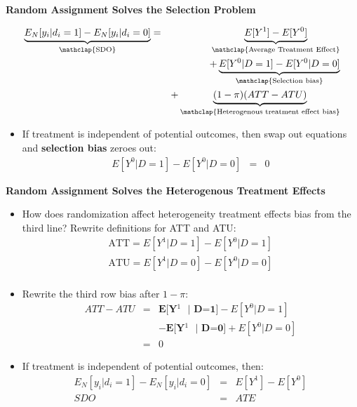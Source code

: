 \documentclass[notes=show]{beamer}
\begin{document}
\begin{frame}[plain]
	\begin{center}
	\textbf{Random Assignment Solves the Selection Problem}
	\end{center}

		\begin{eqnarray*}
		\underbrace{E_N[y_i | d_i=1] - E_N[y_i | d_i=0]}_{ \mathclap{\text{SDO}}}&=& \underbrace{E[Y^1] - E[Y^0]}_{ \mathclap{\text{Average Treatment Effect}}} \\
		&&+ \underbrace{E[Y^0|D=1] - E[Y^0 | D=0]}_{ \mathclap{\text{Selection bias}}}  \\
		&& + \underbrace{(1-\pi)(ATT - ATU)}_{ \mathclap{\text{Heterogenous treatment effect bias}}} 
		\end{eqnarray*}


	\begin{itemize}
	\item If treatment is independent of potential outcomes, then swap out equations and \textbf{selection bias} zeroes out:
		\begin{eqnarray*}
		E[Y^0 | D=1] - E[Y^0 | D=0] &=& 0
		\end{eqnarray*}	
	\end{itemize}

\end{frame}

\begin{frame}[shrink=20,plain]
	\begin{center}
	\textbf{Random Assignment Solves the Heterogenous Treatment Effects}
	\end{center}	
	
	\begin{itemize}
	\item How does randomization affect heterogeneity treatment effects bias from the third line?  Rewrite definitions for ATT and ATU:\begin{eqnarray*}
		\text{ATT} = E[Y^1 | D=1] - E[Y^0 | D=1] \\
		\text{ATU} = E[Y^1 | D=0] - E[Y^0 | D=0] \\
		\end{eqnarray*}
	\item Rewrite the third row bias after $1-\pi$:\begin{eqnarray*}
		ATT - ATU &=& \textbf{E[Y$^1$ $|$ D=1]} - E[Y^0 | D=1] \\
		&& - \textbf{E[Y$^1$ $|$ D=0]} + E[Y^0 | D=0] \\
		&=& 0
		\end{eqnarray*}
	\item If treatment is independent of potential outcomes, then:\begin{eqnarray*}
		E_N[y_i | d_i=1] - E_N[y_i | d_i=0]  &=& E[Y^1] - E[Y^0] \\
		SDO &=& ATE
		\end{eqnarray*}
	\end{itemize}
\end{frame}
\end{document}
